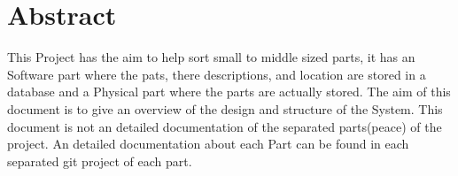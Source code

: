 \chapter*{Abstract}
\thispagestyle{fancy}
This Project has the aim to help sort small to middle sized parts, it has an Software part where the pats, there descriptions, and location are stored in a database and a Physical part where the parts are actually stored.\newline
The aim of this document is to give an overview of the design and structure of the System. This document is not an detailed documentation of the separated parts(peace) of the project. An detailed documentation about each Part can be found in each separated git project of each part.